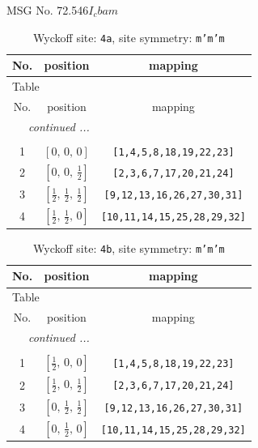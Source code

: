 \documentclass[fleqn,8pt]{jsarticle}
\begin{document}
\setcounter{MaxMatrixCols}{32}

\renewcommand{\tablename}{Table~}
\renewcommand{\figurename}{Figure~}
\begin{center}
\LARGE
MSG No. 72.546\quad$I_{c}bam$
\end{center}
\renewcommand{\arraystretch}{1.2}
\begin{longtable}{ccc}
\caption{Wyckoff site: {\tt 4a}, site symmetry: {\tt m'm'm}}
 \\
 \hline \hline
No. & position & mapping \\ \hline \endfirsthead

\multicolumn{2}{l}{\tablename\ \thetable{}} \\
 \hline \hline
No. & position & mapping \\ \hline \endhead

 \hline \hline
\multicolumn{2}{r}{\footnotesize\it continued ...} \\ \endfoot

 \hline \hline
\multicolumn{2}{r}{} \\ \endlastfoot

1 & $\left[ 0,\, 0,\, 0 \right]$ & {\tt [1,4,5,8,18,19,22,23]} \\ \hline
2 & $\left[ 0,\, 0,\, \frac{1}{2} \right]$ & {\tt [2,3,6,7,17,20,21,24]} \\ \hline
3 & $\left[ \frac{1}{2},\, \frac{1}{2},\, \frac{1}{2} \right]$ & {\tt [9,12,13,16,26,27,30,31]} \\ \hline
4 & $\left[ \frac{1}{2},\, \frac{1}{2},\, 0 \right]$ & {\tt [10,11,14,15,25,28,29,32]} \\
\end{longtable}
\renewcommand{\arraystretch}{1.2}
\begin{longtable}{ccc}
\caption{Wyckoff site: {\tt 4b}, site symmetry: {\tt m'm'm}}
 \\
 \hline \hline
No. & position & mapping \\ \hline \endfirsthead

\multicolumn{2}{l}{\tablename\ \thetable{}} \\
 \hline \hline
No. & position & mapping \\ \hline \endhead

 \hline \hline
\multicolumn{2}{r}{\footnotesize\it continued ...} \\ \endfoot

 \hline \hline
\multicolumn{2}{r}{} \\ \endlastfoot

1 & $\left[ \frac{1}{2},\, 0,\, 0 \right]$ & {\tt [1,4,5,8,18,19,22,23]} \\ \hline
2 & $\left[ \frac{1}{2},\, 0,\, \frac{1}{2} \right]$ & {\tt [2,3,6,7,17,20,21,24]} \\ \hline
3 & $\left[ 0,\, \frac{1}{2},\, \frac{1}{2} \right]$ & {\tt [9,12,13,16,26,27,30,31]} \\ \hline
4 & $\left[ 0,\, \frac{1}{2},\, 0 \right]$ & {\tt [10,11,14,15,25,28,29,32]} \\
\end{longtable}
\end{document}
